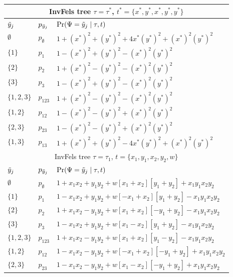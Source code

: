 \begin{table}[ht]
\centering
\begin{tabular}{|l|l|l|}
    \multicolumn{3}{c}{InvFels tree $\tau=\tau^*$, $t^*=\{x^*,y^*,x^*,y^*,y^*\}$}\\
    \hline
$\tilde{y}_j$  & $p_{\tilde{y}_j}$ &$\Pr(\Psi=\tilde{y}_j \mid \tau,t)$\\
    \hline
    $\emptyset$ & $p_{\emptyset}$   &$1+(x^*)^2+(y^*)^2+4x^*(y^*)^2+(x^*)^2(y^*)^2$\\
    $\{1\}$     & $p_{1}$           &$1-(x^*)^2+(y^*)^2-(x^*)^2(y^*)^2$\\
    $\{2\}$     & $p_{2}$           &$1+(x^*)^2-(y^*)^2-(x^*)^2(y^*)^2$\\
    $\{3\}$     & $p_{3}$           &$1-(x^*)^2+(y^*)^2-(x^*)^2(y^*)^2$\\
    $\{1,2,3\}$ & $p_{123}$         &$1+(x^*)^2-(y^*)^2-(x^*)^2(y^*)^2$\\
    $\{1,2\}$   & $p_{12}$          &$1-(x^*)^2-(y^*)^2+(x^*)^2(y^*)^2$\\
    $\{2,3\}$   & $p_{23}$          &$1-(x^*)^2-(y^*)^2+(x^*)^2(y^*)^2$\\
    $\{1,3\}$   & $p_{13}$          &$1+(x^*)^2+(y^*)^2-4x^*(y^*)^2+(x^*)^2(y^*)^2$\\
    \hline
    \multicolumn{3}{c}{InvFels tree $\tau=\tau_1$, $t=\{x_1,y_1,x_2,y_2,w\}$}\\
    \hline
$\tilde{y}_j$  & $p_{\tilde{y}_j}$ &$\Pr(\Psi=\tilde{y}_j \mid \tau,t)$\\
    \hline
    $\emptyset$ & $p_{\emptyset}$   &$1 + x_1x_2 +  y_1y_2 +  w[  x_1 + x_2][  y_1 + y_2] + x_1y_1x_2y_2$\\
    $\{1\}$     & $p_{1}$           &$1 - x_1x_2 +  y_1y_2 +  w[- x_1 + x_2][  y_1 + y_2] - x_1y_1x_2y_2$\\
    $\{2\}$     & $p_{2}$           &$1 + x_1x_2 -  y_1y_2 +  w[  x_1 + x_2][- y_1 + y_2] - x_1y_1x_2y_2$\\
    $\{3\}$     & $p_{3}$           &$1 - x_1x_2 +  y_1y_2 +  w[  x_1 - x_2][  y_1 + y_2] - x_1y_1x_2y_2$\\
    $\{1,2,3\}$ & $p_{123}$         &$1 + x_1x_2 -  y_1y_2 +  w[  x_1 + x_2][  y_1 - y_2] - x_1y_1x_2y_2$\\
    $\{1,2\}$   & $p_{12}$          &$1 - x_1x_2 -  y_1y_2 +  w[- x_1 + x_2][- y_1 + y_2] + x_1y_1x_2y_2$\\
    $\{2,3\}$   & $p_{23}$          &$1 - x_1x_2 -  y_1y_2 +  w[  x_1 - x_2][- y_1 + y_2] + x_1y_1x_2y_2$\\

\end{tabular}
\end{table}

